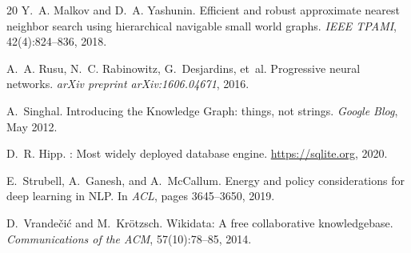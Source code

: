 \documentclass[11pt,twocolumn]{article}
\begin{document}
\begin{thebibliography}{20}
Y.~A. Malkov and D.~A. Yashunin.
\newblock Efficient and robust approximate nearest neighbor search using hierarchical navigable small world graphs.
\newblock \emph{IEEE TPAMI}, 42(4):824--836, 2018.

A.~A. Rusu, N.~C. Rabinowitz, G.~Desjardins, et~al.
\newblock Progressive neural networks.
\newblock \emph{arXiv preprint arXiv:1606.04671}, 2016.

A.~Singhal.
\newblock Introducing the Knowledge Graph: things, not strings.
\newblock \emph{Google Blog}, May 2012.

D.~R. Hipp.
: Most widely deployed database engine.
\newblock \url{https://sqlite.org}, 2020.

E.~Strubell, A.~Ganesh, and A.~McCallum.
\newblock Energy and policy considerations for deep learning in {NLP}.
\newblock In \emph{ACL}, pages 3645--3650, 2019.

D.~Vrande{\v{c}}i{\'c} and M.~Kr{\"o}tzsch.
\newblock Wikidata: A free collaborative knowledgebase.
\newblock \emph{Communications of the ACM}, 57(10):78--85, 2014.

\end{thebibliography}
\end{document}
